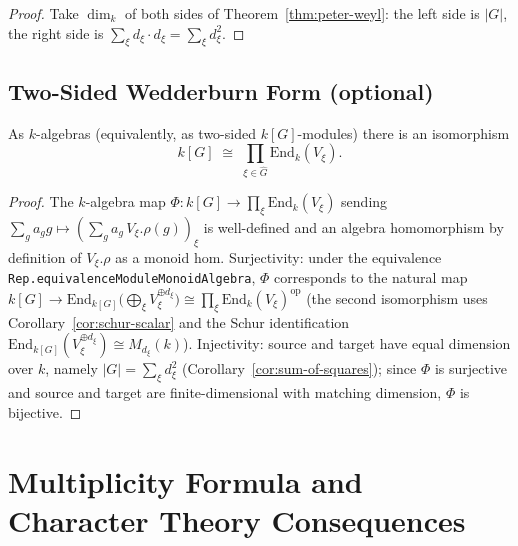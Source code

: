 \begin{proof}
  Take $\dim_k$ of both sides of Theorem~\ref{thm:peter-weyl}: the left
  side is $|G|$, the right side is $\sum_\xi d_\xi \cdot d_\xi = \sum_\xi d_\xi^2$.
\end{proof}

\section{Two-Sided Wedderburn Form (optional)}

\begin{theorem}
  \label{thm:wedderburn}
  As $k$-algebras (equivalently, as two-sided $k[G]$-modules) there is an
  isomorphism
  \[
    k[G] \;\cong\; \prod_{\xi \in \hat G} \mathrm{End}_k(V_\xi).
  \]
\end{theorem}

\begin{proof}
  The $k$-algebra map $\Phi : k[G] \to \prod_\xi \mathrm{End}_k(V_\xi)$
  sending $\sum_g a_g g \mapsto (\sum_g a_g\,V_\xi.\rho(g))_\xi$ is well-defined
  and an algebra homomorphism by definition of $V_\xi.\rho$ as a monoid hom.
  Surjectivity: under the equivalence
  \texttt{Rep.equivalenceModuleMonoidAlgebra}, $\Phi$ corresponds to the
  natural map
  $k[G] \to \mathrm{End}_{k[G]}\bigl(\bigoplus_\xi V_\xi^{\oplus d_\xi}\bigr)
  \cong \prod_\xi \mathrm{End}_k(V_\xi)^{\mathrm{op}}$
  (the second isomorphism uses Corollary~\ref{cor:schur-scalar} and the
  Schur identification $\mathrm{End}_{k[G]}(V_\xi^{\oplus d_\xi}) \cong
  M_{d_\xi}(k)$). Injectivity: source and target have equal dimension over $k$,
  namely $|G| = \sum_\xi d_\xi^2$ (Corollary~\ref{cor:sum-of-squares}); since
  $\Phi$ is surjective and source and target are finite-dimensional with
  matching dimension, $\Phi$ is bijective.
\end{proof}


\chapter{Multiplicity Formula and Character Theory Consequences}
\label{chap:character-consequences}

